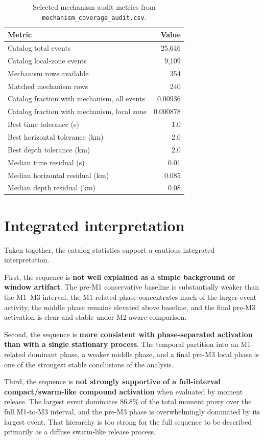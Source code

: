 \documentclass[11pt]{article}
\begin{document}
\begin{table}[H]
\centering
\caption{Selected mechanism audit metrics from \texttt{mechanism\_coverage\_audit.csv}.}
\label{tab:mecha}
\begin{tabular}{lr}
\toprule
Metric & Value \\
\midrule
Catalog total events & 25,646 \\
Catalog local-zone events & 9,109 \\
Mechanism rows available & 354 \\
Matched mechanism rows & 240 \\
Catalog fraction with mechanism, all events & 0.00936 \\
Catalog fraction with mechanism, local zone & 0.000878 \\
Best time tolerance (s) & 1.0 \\
Best horizontal tolerance (km) & 2.0 \\
Best depth tolerance (km) & 2.0 \\
Median time residual (s) & 0.01 \\
Median horizontal residual (km) & 0.085 \\
Median depth residual (km) & 0.08 \\
\bottomrule
\end{tabular}
\end{table}

\section{Integrated interpretation}
Taken together, the catalog statistics support a cautious integrated interpretation.

First, the sequence is \textbf{not well explained as a simple background or window artifact}. The pre-M1 conservative baseline is substantially weaker than the M1--M3 interval, the M1-related phase concentrates much of the larger-event activity, the middle phase remains elevated above baseline, and the final pre-M3 activation is clear and stable under M2-aware comparison.

Second, the sequence is \textbf{more consistent with phase-separated activation than with a single stationary process}. The temporal partition into an M1-related dominant phase, a weaker middle phase, and a final pre-M3 local phase is one of the strongest stable conclusions of the analysis.

Third, the sequence is \textbf{not strongly supportive of a full-interval compact/swarm-like compound activation} when evaluated by moment release. The largest event dominates 86.8\% of the total moment proxy over the full M1-to-M3 interval, and the pre-M3 phase is overwhelmingly dominated by its largest event. That hierarchy is too strong for the full sequence to be described primarily as a diffuse swarm-like release process.
\end{document}
